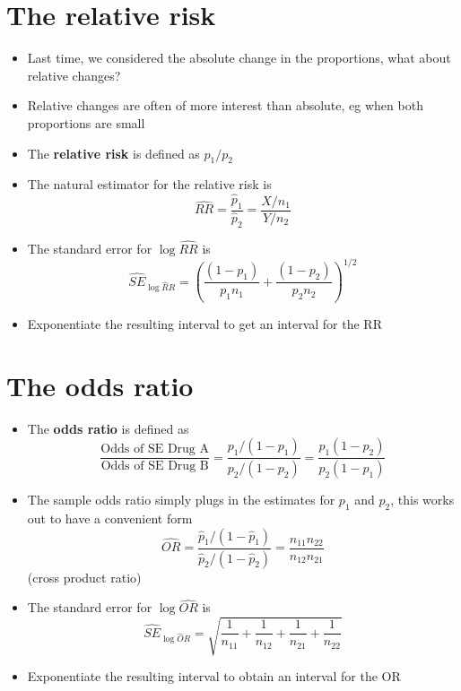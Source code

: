 \documentclass[aspectratio=169]{beamer}
\begin{document}
\section{The relative risk}
\begin{frame}
  \begin{itemize}
  \item Last time, we considered the absolute change in the proportions, what
    about relative changes?
  \item Relative changes are often of more interest than absolute, eg
    when both proportions are small
  \item The {\bf relative risk} is defined as $p_1 / p_2$
  \item The natural estimator for the relative risk is 
    $$\hat{RR} = \frac{\hat p_1}{\hat p_2} = \frac{X / n_1}{Y / n_2}$$
  \item The standard error for $\log \hat{RR}$  is 
    $$
    \hat{SE}_{\log \hat RR} = \left(\frac{(1 - p_1)}{p_1 n_1} + \frac{(1 - p_2)}{p_2 n_2}\right)^{1/2}
    $$
  \item Exponentiate the resulting interval to get an interval for the
    RR
  \end{itemize}
\end{frame}

\section{The odds ratio}
\begin{frame}
  \begin{itemize}
  \item The {\bf odds ratio} is defined as
    $$
    \frac{\mbox{Odds of SE Drug A}}{\mbox{Odds of SE Drug B}} = 
    \frac{p_1 / (1 - p_1)}{p_2 / (1 - p_2)} = 
    \frac{p_1(1-p_2)}{p_2(1 - p_1)}
    $$
  \item The sample odds ratio simply plugs in the estimates for $p_1$ and $p_2$,
    this works out to have a convenient form
    $$
    \hat{OR} = \frac{\hat p_1 / (1 - \hat p_1)}{\hat p_2 / (1 - \hat p_2)}
    = \frac{n_{11}n_{22}}{n_{12}n_{21}}
    $$
    (cross product ratio)
  \item The standard error for $\log \hat{OR}$ is 
    $$
    \hat{SE}_{\log \hat OR} = \sqrt{\frac{1}{n_{11}} + \frac{1}{n_{12}} +\frac{1}{n_{21}} + \frac{1}{n_{22}}}
    $$
  \item Exponentiate the resulting interval to obtain an interval for
    the OR
  \end{itemize}
\end{frame}
\end{document}
